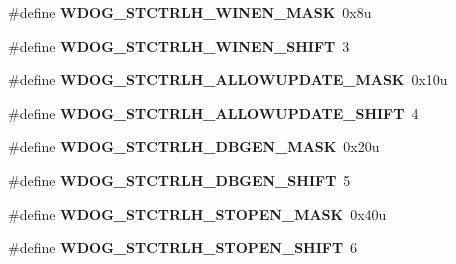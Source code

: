 \begin{DoxyCompactItemize}
\item 
\#define {\bfseries W\+D\+O\+G\+\_\+\+S\+T\+C\+T\+R\+L\+H\+\_\+\+W\+I\+N\+E\+N\+\_\+\+M\+A\+SK}~0x8u\hypertarget{group__WDOG__Register__Masks_ga74edc83d2a673f012aeff6410a8be861}{}\label{group__WDOG__Register__Masks_ga74edc83d2a673f012aeff6410a8be861}

\item 
\#define {\bfseries W\+D\+O\+G\+\_\+\+S\+T\+C\+T\+R\+L\+H\+\_\+\+W\+I\+N\+E\+N\+\_\+\+S\+H\+I\+FT}~3\hypertarget{group__WDOG__Register__Masks_gae0770ee0a74441bd3d2e0d3c291ca4b6}{}\label{group__WDOG__Register__Masks_gae0770ee0a74441bd3d2e0d3c291ca4b6}

\item 
\#define {\bfseries W\+D\+O\+G\+\_\+\+S\+T\+C\+T\+R\+L\+H\+\_\+\+A\+L\+L\+O\+W\+U\+P\+D\+A\+T\+E\+\_\+\+M\+A\+SK}~0x10u\hypertarget{group__WDOG__Register__Masks_gaf524a1ad1f811741b27f29836d6137ee}{}\label{group__WDOG__Register__Masks_gaf524a1ad1f811741b27f29836d6137ee}

\item 
\#define {\bfseries W\+D\+O\+G\+\_\+\+S\+T\+C\+T\+R\+L\+H\+\_\+\+A\+L\+L\+O\+W\+U\+P\+D\+A\+T\+E\+\_\+\+S\+H\+I\+FT}~4\hypertarget{group__WDOG__Register__Masks_gaf2ae60bccb334321f860b2480d916604}{}\label{group__WDOG__Register__Masks_gaf2ae60bccb334321f860b2480d916604}

\item 
\#define {\bfseries W\+D\+O\+G\+\_\+\+S\+T\+C\+T\+R\+L\+H\+\_\+\+D\+B\+G\+E\+N\+\_\+\+M\+A\+SK}~0x20u\hypertarget{group__WDOG__Register__Masks_ga837911a61f223e74ea90cca76f08a787}{}\label{group__WDOG__Register__Masks_ga837911a61f223e74ea90cca76f08a787}

\item 
\#define {\bfseries W\+D\+O\+G\+\_\+\+S\+T\+C\+T\+R\+L\+H\+\_\+\+D\+B\+G\+E\+N\+\_\+\+S\+H\+I\+FT}~5\hypertarget{group__WDOG__Register__Masks_ga9fdcaa733bd0393d4bce730c1d2c90c5}{}\label{group__WDOG__Register__Masks_ga9fdcaa733bd0393d4bce730c1d2c90c5}

\item 
\#define {\bfseries W\+D\+O\+G\+\_\+\+S\+T\+C\+T\+R\+L\+H\+\_\+\+S\+T\+O\+P\+E\+N\+\_\+\+M\+A\+SK}~0x40u\hypertarget{group__WDOG__Register__Masks_gab78af949041ea10c257c8276c8e2782a}{}\label{group__WDOG__Register__Masks_gab78af949041ea10c257c8276c8e2782a}

\item 
\#define {\bfseries W\+D\+O\+G\+\_\+\+S\+T\+C\+T\+R\+L\+H\+\_\+\+S\+T\+O\+P\+E\+N\+\_\+\+S\+H\+I\+FT}~6\hypertarget{group__WDOG__Register__Masks_ga46b2b7b0c6a5938cfa26d96ba332d5d0}{}\label{group__WDOG__Register__Masks_ga46b2b7b0c6a5938cfa26d96ba332d5d0}


\end{DoxyCompactItemize}
